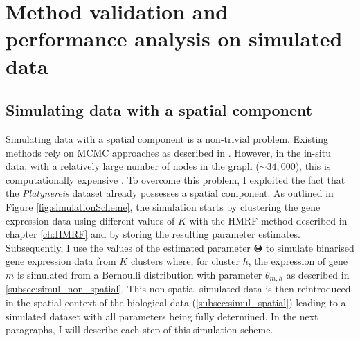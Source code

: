 \chapter{Method validation and performance analysis on simulated data}\label{ch:simulations} 

\section{Simulating data with a spatial component }
Simulating data with a spatial component is a non-trivial problem. Existing methods rely on MCMC approaches as described in \cite{Chalmond89}. However, in the \platy{} in-situ data, with a relatively large number of nodes in the graph ($\sim 34,000$), this is computationally expensive \cite{belloni09}. To overcome this problem, I exploited the fact that the {\it{Platynereis}} dataset already possesses a spatial component. As outlined in Figure \ref{fig:simulationScheme}, the simulation starts by clustering the gene expression data using different values of $K$ with the HMRF method described in chapter \ref{ch:HMRF} and by storing the resulting parameter estimates. Subsequently, I use the values of the estimated parameter $\boldsymbol{\Theta}$ to simulate binarised gene expression data from $K$ clusters where, for cluster $h$, the expression of gene $m$ is simulated from a Bernoulli distribution with parameter $\theta_{m,h}$ as described in \ref{subsec:simul_non_spatial}. This non-spatial simulated data is then reintroduced in the spatial context of the biological data (\ref{subsec:simul_spatial}) leading to a simulated dataset with all parameters being fully determined. In the next paragraphs, I will describe each step of this simulation scheme.

